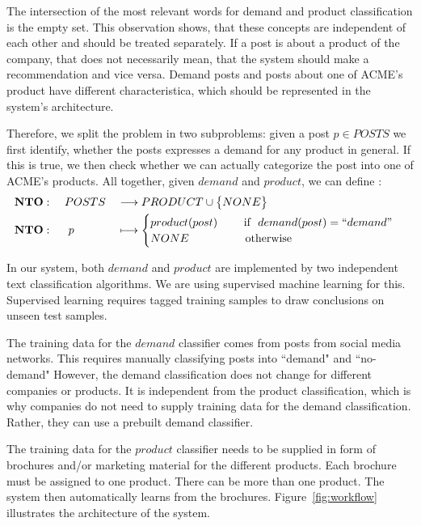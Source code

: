 The intersection of the most relevant words for demand and product classification is the empty set.
This observation shows, that these concepts are independent of each other and should be treated separately.
If a post is about a product of the company, that does not necessarily mean, that the system should make a recommendation and vice versa.
Demand posts and posts about one of ACME's product have different characteristica, which should be represented in the system's architecture.

Therefore, we split the \nto problem in two subproblems: given a post $p \in POSTS$ we first identify, whether the posts expresses a demand for any product in general.
If this is true, we then check whether we can actually categorize the post into one of ACME's products.
All together, given $demand$ and $product$, we can define \nto:
\begin{alignat*}{3}
  &\mathbf{NTO}: && ~POSTS && \longrightarrow PRODUCT \cup \big\{ NONE \big\} \\
  &\mathbf{NTO}: && ~~p   && \longmapsto \begin{cases}
	    product(post)~~~~~~~\text{if }~demand(post) = ``demand" \\
	    NONE~~~~~~~~~~~~~~~\text{otherwise}
   \end{cases}
\end{alignat*}

In our system, both $demand$ and $product$ are implemented by two independent text classification algorithms.
We are using supervised machine learning for this.
Supervised learning requires tagged training samples to draw conclusions on unseen test samples.

The training data for the $demand$ classifier comes from posts from social media networks.
This requires manually classifying posts into ``demand" and ``no-demand"
However, the demand classification does not change for different companies or products.
It is independent from the product classification, which is why companies do not need to supply training data for the demand classification.
Rather, they can use a prebuilt demand classifier.

The training data for the $product$ classifier needs to be supplied in form of brochures and/or marketing material for the different products.
Each brochure must be assigned to one product.
There can be more than one product.
The system then automatically learns from the brochures.
Figure~\ref{fig:workflow} illustrates the architecture of the system.


